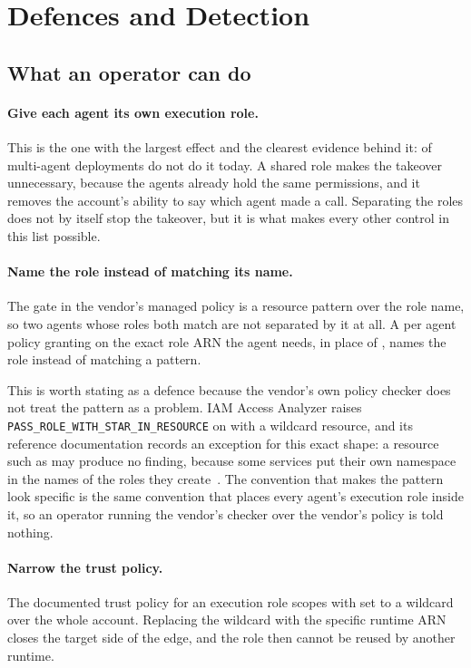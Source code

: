 \section{Defences and Detection}
\label{sec:defences}

\subsection{What an operator can do}

\paragraph{Give each agent its own execution role.}
This is the one with the largest effect and the clearest evidence behind it:
\nSharedRoleRuntimes of \nMultiAgentRuntimes multi-agent deployments do not do
it today. A shared role makes the takeover unnecessary, because the agents
already hold the same permissions, and it removes the account's ability to
say which agent made a call. Separating the roles does not by itself stop the
takeover, but it is what makes every other control in this list possible.

\paragraph{Name the role instead of matching its name.}
The gate in the vendor's managed policy is a resource pattern over the role
name, so two agents whose roles both match  are not
separated by it at all. A per agent policy granting  on the
exact role ARN the agent needs, in place of
, names the role instead of matching a
pattern.

This is worth stating as a defence because the vendor's own policy checker
does not treat the pattern as a problem. IAM Access Analyzer raises
\texttt{PASS\_ROLE\_WITH\_STAR\_IN\_RESOURCE} on  with a
wildcard resource, and its reference documentation records an exception for
this exact shape: a resource such as  may
produce no finding, because some services put their own namespace in the names
of the roles they create~\cite{awsAccessAnalyzerChecks}. The convention that
makes the pattern look specific is the same convention that places every
agent's execution role inside it, so an operator running the vendor's checker
over the vendor's policy is told nothing.

\paragraph{Narrow the trust policy.}
The documented trust policy for an execution role scopes
 with  set to a wildcard over the whole
account. Replacing the wildcard with the specific runtime ARN closes the
target side of the edge, and the role then cannot be reused by
another runtime.

